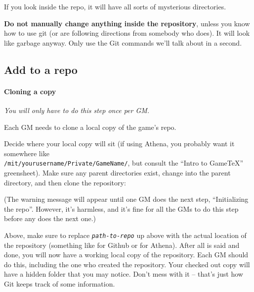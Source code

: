 \documentclass[green]{testgame}
\begin{document}

If you look inside the repo, it will have all sorts of mysterious directories.


\textbf{Do not manually change anything inside the repository}, unless you know how to use git (or are following directions from somebody who does). It will look like garbage anyway. Only use the Git commands we'll talk about in a second.

\subsection{Add \gametex{} to a repo}

\paragraph*{Cloning a copy}

\emph{You will only have to do this step once per GM.}

Each GM needs to clone a local copy of the game's repo.

Decide where your local copy will sit (if using Athena, you probably
want it somewhere like\\ {\tt /mit/yourusername/Private/GameName/},
but consult the ``Intro to GameTeX'' greensheet). Make sure any parent directories exist, change into the parent directory, and then clone the repository:


(The warning message will appear until one GM does the next step, ``Initializing the repo''. However, it's harmless, and it's fine for all the GMs to do this step before any does the next one.)

Above, make sure to replace \texttt{\emph{path-to-repo}} up above with the
actual location of the repository (something like
 for Github or
 for Athena).  After all
is said and done, you will now have a working local copy of the repository.
Each GM should do this, including the one who created the repository. Your
checked out copy will have a hidden  folder that you may notice.
Don't mess with it -- that's just how Git keeps track of some information.
\end{document}
